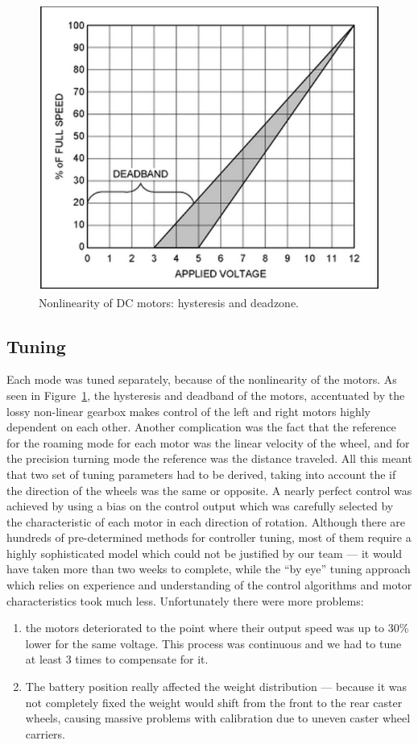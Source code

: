 \begin{figure}
  \centering
  \includegraphics[width=\linewidth]{images/deadband.png}
  \caption{Nonlinearity of DC motors: hysteresis and deadzone.}
  \label{fig:deadband}
\end{figure}
\subsection{Tuning}
Each mode was tuned separately, because of the nonlinearity of the motors. As
seen in Figure~\ref{fig:deadband}, the hysteresis and deadband of the motors,
accentuated by the lossy non-linear gearbox makes control of the left and right
motors highly dependent on each other. Another complication was the fact that
the reference for the roaming mode for each motor was the linear velocity of the
wheel, and for the precision turning mode the reference was the distance
traveled. All this meant that two set of tuning parameters had to be derived,
taking into account the if the direction of the wheels was the same or opposite.
A nearly perfect control was achieved by using a bias on the control output
which was carefully selected by the characteristic of each motor in each
direction of rotation. Although there are hundreds of pre-determined methods for
controller tuning, most of them require a highly sophisticated model which could
not be justified by our team --- it would have taken more than two weeks to
complete, while the ``by eye'' tuning approach which relies on experience and
understanding of the control algorithms and motor characteristics took much
less. Unfortunately there were more problems: 
\begin{enumerate}
\item the motors deteriorated to the point where their output speed was up to
  30\% lower for the same voltage. This process was continuous and we had to
  tune at least 3 times to compensate for it.
\item The battery position really affected the weight distribution --- because it was
not completely fixed the weight would shift from the front to the rear caster
wheels, causing massive problems with calibration due to uneven caster wheel
carriers.
\end{enumerate}

